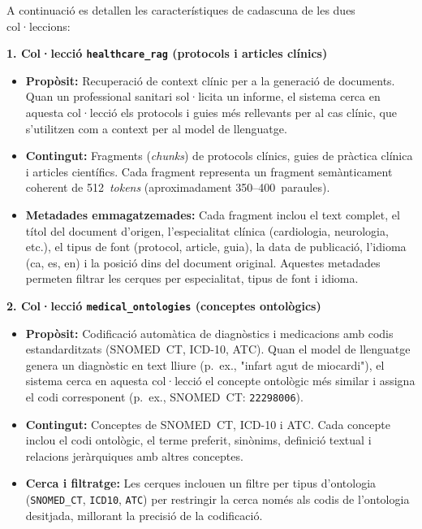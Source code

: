 \documentclass[CAT]{TFUOC}%
\begin{document}
A continuació es detallen les característiques de cadascuna de les dues col·leccions:

\textbf{1. Col·lecció \texttt{healthcare\_rag} (protocols i articles clínics)}

\begin{itemize}
    \item \textbf{Propòsit:} Recuperació de context clínic per a la generació de documents. Quan un professional sanitari sol·licita un informe, el sistema cerca en aquesta col·lecció els protocols i guies més rellevants per al cas clínic, que s'utilitzen com a context per al model de llenguatge.
    
    \item \textbf{Contingut:} Fragments (\textit{chunks}) de protocols clínics, guies de pràctica clínica i articles científics. Cada fragment representa un fragment semànticament coherent de 512~\textit{tokens} (aproximadament 350--400~paraules).
    
    \item \textbf{Metadades emmagatzemades:} Cada fragment inclou el text complet, el títol del document d'origen, l'especialitat clínica (cardiologia, neurologia, etc.), el tipus de font (protocol, article, guia), la data de publicació, l'idioma (ca, es, en) i la posició dins del document original. Aquestes metadades permeten filtrar les cerques per especialitat, tipus de font i idioma.
\end{itemize}

\textbf{2. Col·lecció \texttt{medical\_ontologies} (conceptes ontològics)}

\begin{itemize}
    \item \textbf{Propòsit:} Codificació automàtica de diagnòstics i medicacions amb codis estandarditzats (SNOMED~CT, ICD-10, ATC). Quan el model de llenguatge genera un diagnòstic en text lliure (p.~ex., "infart agut de miocardi"), el sistema cerca en aquesta col·lecció el concepte ontològic més similar i assigna el codi corresponent (p.~ex., SNOMED~CT: \texttt{22298006}).
    
    \item \textbf{Contingut:} Conceptes de SNOMED~CT, ICD-10 i ATC. Cada concepte inclou el codi ontològic, el terme preferit, sinònims, definició textual i relacions jeràrquiques amb altres conceptes.
    
    \item \textbf{Cerca i filtratge:} Les cerques inclouen un filtre per tipus d'ontologia (\texttt{SNOMED\_CT}, \texttt{ICD10}, \texttt{ATC}) per restringir la cerca només als codis de l'ontologia desitjada, millorant la precisió de la codificació.
\end{itemize}
\end{document}
